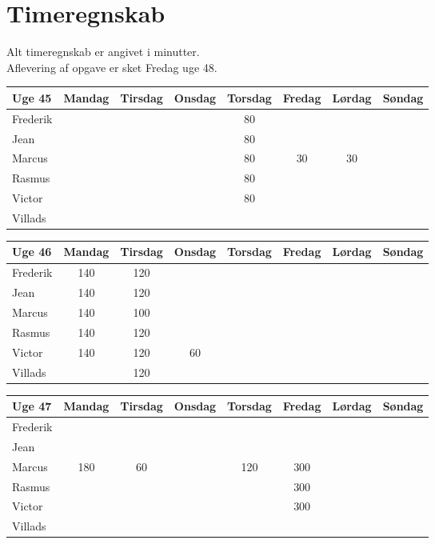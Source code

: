 \section*{Timeregnskab}

Alt timeregnskab er angivet i minutter.\\
Aflevering af opgave er sket Fredag uge 48.
\begin{table}[H]
\centering
\begin{tabular}{@{}lccccccc@{}} %
\toprule
Uge 45   & Mandag & Tirsdag & Onsdag & Torsdag & Fredag & Lørdag & Søndag \\ \midrule
Frederik &    &    &    &  80  &    &    &    \\
Jean     &    &    &    &  80  &    &    &    \\
Marcus   &    &    &    &  80  &  30  &  30  &    \\
Rasmus   &    &    &    &  80  &    &    &    \\
Victor   &    &    &    &  80  &    &    &    \\
Villads  &    &    &    &      &    &    &    \\ 
\end{tabular}

\begin{tabular}{@{}lccccccc@{}}
\toprule
Uge 46   & Mandag & Tirsdag & Onsdag & Torsdag & Fredag & Lørdag & Søndag \\ \midrule
Frederik &  140  &  120  &    &    &    &    &    \\
Jean     &  140  &  120  &    &    &    &    &    \\
Marcus   &  140  &  100  &    &    &    &    &    \\
Rasmus   &  140  &  120  &    &    &    &    &    \\
Victor   &  140  &  120  &  60  &    &    &    &    \\
Villads  &    &   120 &    &    &    &    &    \\ 
\end{tabular}

\begin{tabular}{@{}lccccccc@{}}
\toprule
Uge 47   & Mandag & Tirsdag & Onsdag & Torsdag & Fredag & Lørdag & Søndag \\ \midrule
Frederik &    &    &    &    &    &    &    \\
Jean     &    &    &    &    &    &    &    \\
Marcus   &  180  &  60  &    &  120  &  300  &    &    \\
Rasmus   &    &    &    &    &  300  &    &    \\
Victor   &    &    &    &    &  300  &    &    \\
Villads  &    &    &    &    &    &    &    \\ 
\end{tabular}


\end{table}
